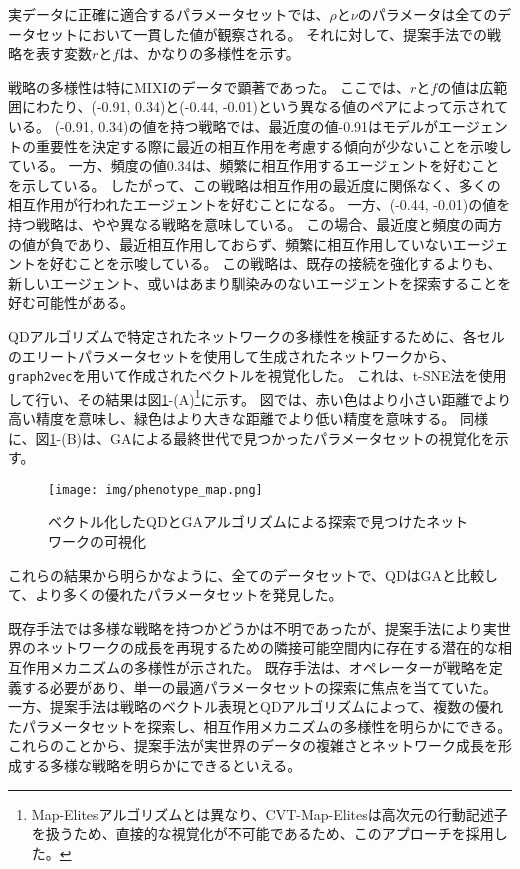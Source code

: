 \documentclass[uplatex,11pt,openany]{ujreport}
\begin{document}
            実データに正確に適合するパラメータセットでは、$\rho$と$\nu$のパラメータは全てのデータセットにおいて一貫した値が観察される。
            それに対して、提案手法での戦略を表す変数$r$と$f$は、かなりの多様性を示す。

            戦略の多様性は特にMIXIのデータで顕著であった。
            ここでは、$r$と$f$の値は広範囲にわたり、(-0.91, 0.34)と(-0.44, -0.01)という異なる値のペアによって示されている。
            (-0.91, 0.34)の値を持つ戦略では、最近度の値-0.91はモデルがエージェントの重要性を決定する際に最近の相互作用を考慮する傾向が少ないことを示唆している。
            一方、頻度の値0.34は、頻繁に相互作用するエージェントを好むことを示している。
            したがって、この戦略は相互作用の最近度に関係なく、多くの相互作用が行われたエージェントを好むことになる。
            一方、(-0.44, -0.01)の値を持つ戦略は、やや異なる戦略を意味している。
            この場合、最近度と頻度の両方の値が負であり、最近相互作用しておらず、頻繁に相互作用していないエージェントを好むことを示唆している。
            この戦略は、既存の接続を強化するよりも、新しいエージェント、或いはあまり馴染みのないエージェントを探索することを好む可能性がある。

            QDアルゴリズムで特定されたネットワークの多様性を検証するために、各セルのエリートパラメータセットを使用して生成されたネットワークから、\verb|graph2vec|を用いて作成されたベクトルを視覚化した。
            これは、t-SNE法\cite{vandermaatenVisualizingDataUsing2008}を使用して行い、その結果は図\ref{fig:phenotype_map}-(A)\footnote{Map-Elitesアルゴリズムとは異なり、CVT-Map-Elitesは高次元の行動記述子を扱うため、直接的な視覚化が不可能であるため、このアプローチを採用した。}に示す。
            図では、赤い色はより小さい距離でより高い精度を意味し、緑色はより大きな距離でより低い精度を意味する。
            同様に、図\ref{fig:phenotype_map}-(B)は、GAによる最終世代で見つかったパラメータセットの視覚化を示す。
            \begin{figure}[htbp]
                \centering
                \texttt{[image: img/phenotype\_map.png]}
                \caption{ベクトル化したQDとGAアルゴリズムによる探索で見つけたネットワークの可視化}
                \label{fig:phenotype_map}
            \end{figure}
            これらの結果から明らかなように、全てのデータセットで、QDはGAと比較して、より多くの優れたパラメータセットを発見した。

            既存手法では多様な戦略を持つかどうかは不明であったが、提案手法により実世界のネットワークの成長を再現するための隣接可能空間内に存在する潜在的な相互作用メカニズムの多様性が示された。
            既存手法は、オペレーターが戦略を定義する必要があり、単一の最適パラメータセットの探索に焦点を当てていた。
            一方、提案手法は戦略のベクトル表現とQDアルゴリズムによって、複数の優れたパラメータセットを探索し、相互作用メカニズムの多様性を明らかにできる。
            これらのことから、提案手法が実世界のデータの複雑さとネットワーク成長を形成する多様な戦略を明らかにできるといえる。
\end{document}

